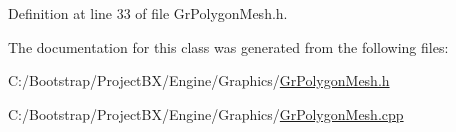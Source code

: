 Definition at line 33 of file GrPolygonMesh.h.

The documentation for this class was generated from the following files:\begin{CompactItemize}
\item 
C:/Bootstrap/ProjectBX/Engine/Graphics/\hyperlink{_gr_polygon_mesh_8h}{GrPolygonMesh.h}\item 
C:/Bootstrap/ProjectBX/Engine/Graphics/\hyperlink{_gr_polygon_mesh_8cpp}{GrPolygonMesh.cpp}\end{CompactItemize}
